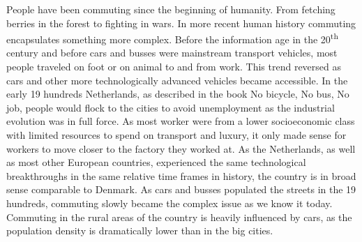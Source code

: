 People have been commuting since the beginning of humanity. 
From fetching berries in the forest to fighting in wars. 
In more recent human history commuting encapsulates something more complex.
Before the information age in the 20\textsuperscript{th} century and before cars and busses were mainstream transport vehicles, most people traveled on foot or on animal to and from work.
This trend reversed as cars and other more technologically advanced vehicles became accessible.
In the early 19 hundreds Netherlands, as described in the book No bicycle, No bus, No job, people would flock to the cities to avoid unemployment as the industrial evolution was in full force.
As most worker were from a lower socioeconomic class with limited resources to spend on transport and luxury, it only made sense for workers to move closer to the factory they worked at.
As the Netherlands, as well as most other European countries, experienced the same technological breakthroughs in the same relative time frames in history, the country is in broad sense comparable to Denmark.
As cars and busses populated the streets in the 19 hundreds, commuting slowly became the complex issue as we know it today.
Commuting in the rural areas of the country is heavily influenced by cars, as the population density is dramatically lower than in the big cities.
